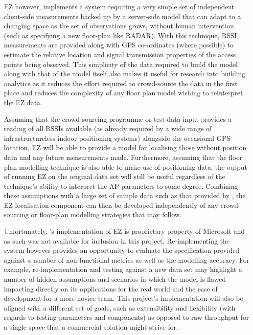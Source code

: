 \documentclass{UoYCSproject}
\begin{document}
        EZ however, implements a system requiring a very simple set of independent client-side measurements backed up by a server-side model that can adapt to a changing space as the set of observations grows, without human intervention (such as specifying a new floor-plan like RADAR). With this technique, RSSI measurements are provided along with GPS co-ordinates (where possible) to estimate the relative location and signal transmission properties of the access points being observed. This simplicity of the data required to build the model along with that of the model itself also makes it useful for research into building analytics as it reduces the effort required to crowd-source the data in the first place and reduces the complexity of any floor plan model wishing to reinterpret the EZ data.
        
        Assuming that the crowd-sourcing programme or test data input provides a reading of all RSSIs available (as already required by a wide range of infrastructureless indoor positioning systems) alongside the occasional GPS location, EZ will be able to provide a model for localising those without position data and any future measurements made. Furthermore, assuming that the floor plan modelling technique is also able to make use of positioning data, the output of running EZ on the original data set will still be useful regardless of the technique's ability to interpret the AP parameters to some degree. Combining these assumptions with a large set of sample data such as that provided by \citet{torres2014ujiindoorloc}, the EZ localisation component can then be developed independently of any crowd-sourcing or floor-plan modelling strategies that may follow.
        
        Unfortunately, \citeauthor{chintalapudi2010indoor}'s implementation of EZ is proprietary property of Microsoft and as such was not available for inclusion in this project. Re-implementing the system however provides an opportunity to evaluate the specification provided against a number of non-functional metrics as well as the modelling accuracy. For example, re-implementation and testing against a new data set may highlight a number of hidden assumptions and scenarios in which the model is flawed impacting directly on its applications for the real world and the ease of development for a more novice team. This project's implementation will also be aligned with a different set of goals, such as extensibility and flexibility (with regards to testing parameters and components) as opposed to raw throughput for a single space that a commercial solution might strive for.
 
\end{document}
